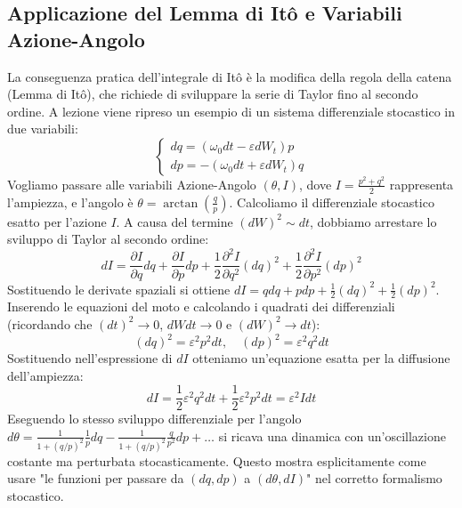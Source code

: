 \documentclass[12pt,a4paper]{article}
\begin{document}
\subsection{Applicazione del Lemma di Itô e Variabili Azione-Angolo}
La conseguenza pratica dell'integrale di Itô è la modifica della regola della catena (Lemma di Itô), che richiede di sviluppare la serie di Taylor fino al secondo ordine. A lezione viene ripreso un esempio di un sistema differenziale stocastico in due variabili:
\begin{equation}
\begin{cases}
dq = (\omega_0 dt - \varepsilon dW_t) p \\
dp = -(\omega_0 dt + \varepsilon dW_t) q
\end{cases}
\end{equation}
Vogliamo passare alle variabili Azione-Angolo $(\theta, I)$, dove $I = \frac{p^2+q^2}{2}$ rappresenta l'ampiezza, e l'angolo è $\theta = \arctan\left(\frac{q}{p}\right)$.
Calcoliamo il differenziale stocastico esatto per l'azione $I$. A causa del termine $(dW)^2 \sim dt$, dobbiamo arrestare lo sviluppo di Taylor al secondo ordine:
\begin{equation}
dI = \frac{\partial I}{\partial q} dq + \frac{\partial I}{\partial p} dp + \frac{1}{2}\frac{\partial^2 I}{\partial q^2}(dq)^2 + \frac{1}{2}\frac{\partial^2 I}{\partial p^2}(dp)^2
\end{equation}
Sostituendo le derivate spaziali si ottiene $dI = q dq + p dp + \frac{1}{2}(dq)^2 + \frac{1}{2}(dp)^2$. Inserendo le equazioni del moto e calcolando i quadrati dei differenziali (ricordando che $(dt)^2 \to 0$, $dW dt \to 0$ e $(dW)^2 \to dt$):
\begin{equation}
(dq)^2 = \varepsilon^2 p^2 dt, \quad (dp)^2 = \varepsilon^2 q^2 dt
\end{equation}
Sostituendo nell'espressione di $dI$ otteniamo un'equazione esatta per la diffusione dell'ampiezza:
\begin{equation}
dI = \frac{1}{2} \varepsilon^2 q^2 dt + \frac{1}{2} \varepsilon^2 p^2 dt = \varepsilon^2 I dt
\end{equation}
Eseguendo lo stesso sviluppo differenziale per l'angolo $d\theta = \frac{1}{1+(q/p)^2}\frac{1}{p}dq - \frac{1}{1+(q/p)^2}\frac{q}{p^2}dp + \dots$ si ricava una dinamica con un'oscillazione costante ma perturbata stocasticamente. Questo mostra esplicitamente come usare "le funzioni per passare da $(dq, dp)$ a $(d\theta, dI)$" nel corretto formalismo stocastico.

\newpage
\end{document}
